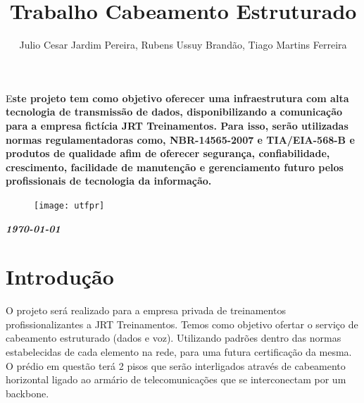 \documentclass[	DIV=calc,%
							paper=a4,%
							fontsize=12pt,%
							onecolumn]{scrartcl}	 					%
\title{Trabalho Cabeamento Estruturado}					%
\author{Julio Cesar Jardim Pereira, Rubens Ussuy Brandão, Tiago Martins Ferreira}  	%
\date{}																				%
\newcommand{\initial}[1]{%
     \lettrine[lines=3,lhang=0.3,nindent=0em]{
     				\color{DarkGoldenrod}
     				{\textsf{#1}}}{}}
\begin{document}
\maketitle
\thispagestyle{fancy} 	
\thispagestyle{empty}		%


\initial{E}\textbf{ste projeto tem como objetivo oferecer uma infraestrutura com alta tecnologia de transmissão de dados, disponibilizando a comunicação para a empresa fictícia JRT Treinamentos. Para isso, serão utilizadas normas regulamentadoras como, NBR-14565-2007 e TIA/EIA-568-B e produtos de qualidade afim de oferecer segurança, confiabilidade, crescimento, facilidade de manutenção e gerenciamento futuro pelos profissionais de tecnologia da informação.
}

\begin{figure}
	\centering
	\texttt{[image: utfpr]}
\end{figure}

\vspace{3cm}
\centerline{\textit{\textbf{\today}}}

\clearpage
    \renewcommand*\listfigurename{Lista de figuras}
\listoffigures

\renewcommand*\listtablename{Lista de tabelas}
\listoftables


\clearpage
\renewcommand{\contentsname}{Sumário}
\tableofcontents
\clearpage

\section{Introdução}
O projeto será realizado para a empresa privada de treinamentos profissionalizantes a JRT Treinamentos. Temos como objetivo ofertar o serviço de cabeamento estruturado (dados e voz). Utilizando padrões dentro das normas estabelecidas de cada elemento na rede, para uma futura certificação da mesma. O prédio em questão terá 2 pisos que serão interligados através de cabeamento horizontal ligado ao armário de telecomunicações que se interconectam por um backbone.
\end{document}
